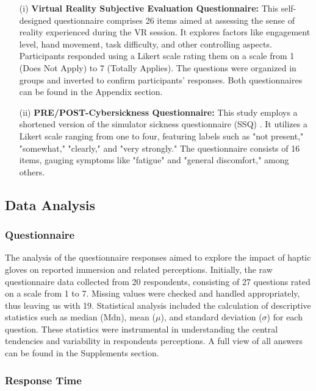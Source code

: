 \documentclass[12pt,oneside,openright]{report}
\begin{document}
\begin{enumerate}
\item[(i)] \textbf{Virtual Reality Subjective Evaluation Questionnaire:} This self-designed questionnaire comprises 26 items aimed at assessing the sense of reality experienced during the VR session. It explores factors like engagement level, hand movement, task difficulty, and other controlling aspects. Participants responded using a Likert scale rating them on a scale from 1 (Does Not Apply) to 7 (Totally Applies). The questions were organized in groups and inverted to confirm participants' responses. Both questionnaires can be found in the Appendix section.

\item[(ii)] \textbf{PRE/POST-Cybersickness Questionnaire:} This study employs a shortened version of the simulator sickness questionnaire (SSQ) \parencite*{avpsy}. It utilizes a Likert scale ranging from one to four, featuring labels such as "not present," "somewhat," "clearly," and "very strongly." The questionnaire consists of 16 items, gauging symptoms like "fatigue" and "general discomfort," among others.
\end{enumerate}

\subsection*{Data Analysis}

\subsubsection*{Questionnaire}
The analysis of the questionnaire responses aimed to explore the impact of haptic gloves on reported immersion and related perceptions. Initially, the raw questionnaire data collected from 20 respondents, consisting of 27 questions rated on a scale from 1 to 7. Missing values were checked and handled appropriately, thus leaving us with 19. Statistical analysis included the calculation of descriptive statistics such as median ($\text{Mdn}$), mean ($\mu$), and standard deviation ($\sigma$) for each question. These statistics were instrumental in understanding the central tendencies and variability in respondents perceptions. A full view of all answers can be found in the Supplements section. 

\subsubsection*{Response Time}
\end{document}
